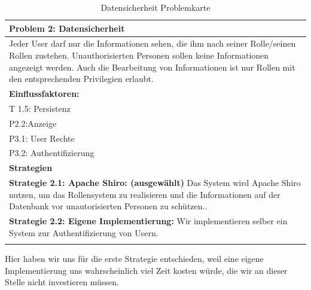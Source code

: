 \documentclass[enabledeprecatedfontcommands,fontsize=12pt,paper=a4,twoside]{scrartcl}
\begin{document}
\begin{table}[H]
    \centering
    \begin{tabular}{|p{15cm}|}
    \hline
          \textbf{Problem 2:} Datensicherheit \\ \hline
          Jeder User darf nur die Informationen sehen, die ihm nach seiner Rolle/seinen Rollen zustehen. Unauthorisierten Personen sollen keine Informationen angezeigt werden. Auch die Bearbeitung von Informationen ist nur Rollen mit den entsprechenden Privilegien erlaubt. \\ \hline
          \textbf{Einflussfaktoren: } \\
          T 1.5: Persistenz \\
	P2.2:Anzeige \\
	P3.1: User Rechte \\
	P3.2: Authentifizierung \\
         \hline
          \textbf{Strategien} \\ \hline
            {}          
           \label{strategie:2.1}     
          \textbf{Strategie 2.1: Apache Shiro: (ausgewählt)} Das System wird Apache Shiro nutzen, um das Rollensystem zu realisieren und die Informationen auf der Datenbank vor unautorisierten Personen zu schützen.. \\ 
            {}          
           \label{strategie:2.2}     
           \textbf{Strategie 2.2: Eigene Implementierung:} Wir implementieren selber ein System zur Authentifizierung von Usern. \\
          \\ \hline
    \end{tabular}
    \caption{Datensicherheit Problemkarte}
    \label{tab:ProblemKarte2}
\end{table}
Hier haben wir uns für die erste Strategie entschieden, weil eine eigene Implementierung uns wahrscheinlich viel Zeit kosten würde, die wir an dieser Stelle nicht investieren müssen. \\
\end{document}
